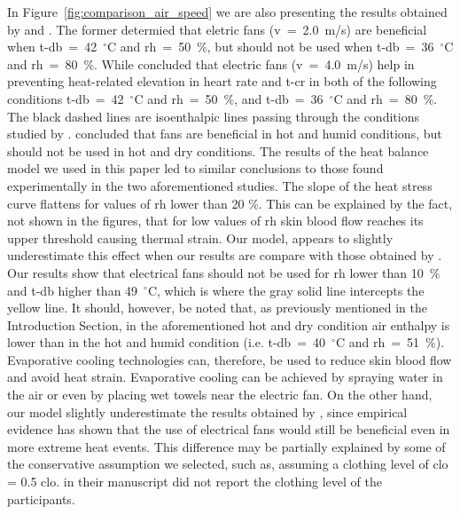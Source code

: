 In Figure~\ref{fig:comparison_air_speed} we are also presenting the results obtained by  and .
The former determied that eletric fans (\ac{v}~=~2.0~m/s) are beneficial when \ac{t-db}~=~42~$^{\circ}$C and \ac{rh}~=~50~\%, but should not be used when \ac{t-db}~=~36~$^{\circ}$C and \ac{rh}~=~80~\%.
While  concluded that electric fans (\ac{v}~=~4.0~m/s) help in preventing heat-related elevation in heart rate and \ac{t-cr} in both of the following conditions \ac{t-db}~=~42~$^{\circ}$C and \ac{rh}~=~50~\%, and \ac{t-db}~=~36~$^{\circ}$C and \ac{rh}~=~80~\%.
The black dashed lines are isoenthalpic lines passing through the conditions studied by .
 concluded that fans are beneficial in hot and humid conditions, but should not be used in hot and dry conditions.
The results of the heat balance model we used in this paper led to similar conclusions to those found experimentally in the two aforementioned studies.
The slope of the heat stress curve flattens for values of \ac{rh} lower than 20 \%.
This can be explained by the fact, not shown in the figures, that for low values of \ac{rh} skin blood flow reaches its upper threshold causing thermal strain.
Our model, appears to slightly underestimate this effect when our results are compare with those obtained by .
Our results show that electrical fans should not be used for \ac{rh} lower than 10~\% and \ac{t-db} higher than 49~$^{\circ}$C\@, which is where the gray solid line intercepts the yellow line.
It should, however, be noted that, as previously mentioned in the Introduction Section, in the aforementioned hot and dry condition air enthalpy is lower than in the hot and humid condition (i.e. \ac{t-db}~=~40~$^{\circ}$C and \ac{rh}~=~51~\%).
Evaporative cooling technologies can, therefore, be used to reduce skin blood flow and avoid heat strain.
Evaporative cooling can be achieved by spraying water in the air or even by placing wet towels near the electric fan.
On the other hand, our model slightly underestimate the results obtained by , since empirical evidence has shown that the use of electrical fans would still be beneficial even in more extreme heat events.
This difference may be partially explained by some of the conservative assumption we selected, such as, assuming a clothing level of \ac{clo} = 0.5 clo.
 in their manuscript did not report the clothing level of the participants.



